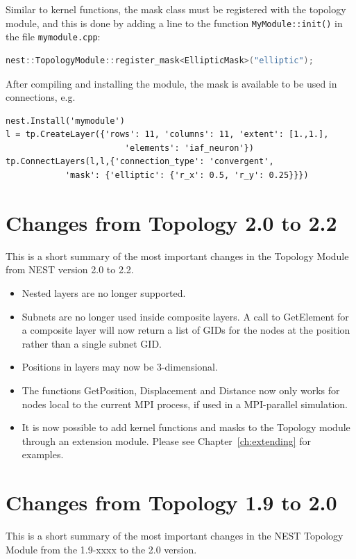 \documentclass[a4paper,12pt]{report}
\begin{document}
Similar to kernel functions, the mask class must be registered with the
topology module, and this is done by adding a line to the function
\lstinline!MyModule::init()! in the file \lstinline!mymodule.cpp!:
\begin{lstlisting}[language=C++]
    nest::TopologyModule::register_mask<EllipticMask>("elliptic");
\end{lstlisting}
After compiling and installing the module, the mask is available to be used
in connections, e.g.
\begin{lstlisting}
nest.Install('mymodule')
l = tp.CreateLayer({'rows': 11, 'columns': 11, 'extent': [1.,1.],
                        'elements': 'iaf_neuron'})
tp.ConnectLayers(l,l,{'connection_type': 'convergent',
            'mask': {'elliptic': {'r_x': 0.5, 'r_y': 0.25}}})
\end{lstlisting}


\chapter{Changes from Topology 2.0 to 2.2}\label{sec:changes}

This is a short summary of the most important changes in the Topology
Module from NEST version 2.0 to 2.2.

\begin{itemize}
\item Nested layers are no longer supported.
\item Subnets are no longer used inside composite layers. A call to
  GetElement for a composite layer will now return a list of GIDs for the
  nodes at the position rather than a single subnet GID.
\item Positions in layers may now be 3-dimensional.
\item The functions GetPosition, Displacement and Distance now only works
  for nodes local to the current MPI process, if used in a MPI-parallel
  simulation.
\item It is now possible to add kernel functions and masks to the Topology
  module through an extension module. Please see Chapter~\ref{ch:extending}
  for examples.
\end{itemize}

\chapter{Changes from Topology 1.9 to 2.0}\label{sec:changes2}

This is a short summary of the most important changes in the NEST
Topology Module from the 1.9-xxxx to the 2.0 version.
\end{document}
